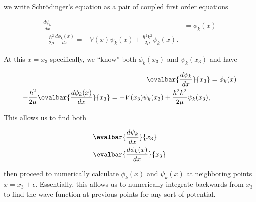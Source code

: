 we write Schr\"{o}dinger's equation as a pair of coupled first order equations

\begin{align}\label{eqn:qmTwoL21:570}
\frac{d\psi_k}{dx} &= \phi_k(x) \\
-\frac{\hbar^2}{2 \mu} \frac{d\phi_k(x)}{dx} = - V(x) \psi_k(x) + \frac{\hbar^2 k^2}{2\mu} \psi_k(x).
\end{align}

At this $x = x_3$ specifically, we ``know'' both $\phi_k(x_3)$ and $\psi_k(x_3)$ and have

\begin{align}\label{eqn:qmTwoL21:590}
\evalbar{\frac{d\psi_k}{dx}}{x_3} &= \phi_k(x) \\
-\frac{\hbar^2}{2 \mu} \evalbar{\frac{d\phi_k(x)}{dx}}{x_3} = 
- V(x_3) \psi_k(x_3) + \frac{\hbar^2 k^2}{2\mu} \psi_k(x_3),
\end{align}

This allows us to find both

\begin{align}\label{eqn:qmTwoL21:610}
&\evalbar{\frac{d\psi_k}{dx}}{x_3} \\
&\evalbar{\frac{d\phi_k(x)}{dx}}{x_3} 
\end{align}

then proceed to numerically calculate $\phi_k(x)$ and $\psi_k(x)$ at neighboring points $x = x_3 + \epsilon$.  Essentially, this allows us to numerically integrate backwards from $x_3$ to find the wave function at previous points for any sort of potential.

\EndArticle
